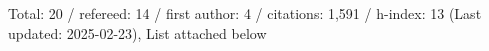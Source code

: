 Total: 20 / refereed: 14 / first author: 4 / citations: 1,591 / h-index: 13 (Last updated: 2025-02-23), List attached below